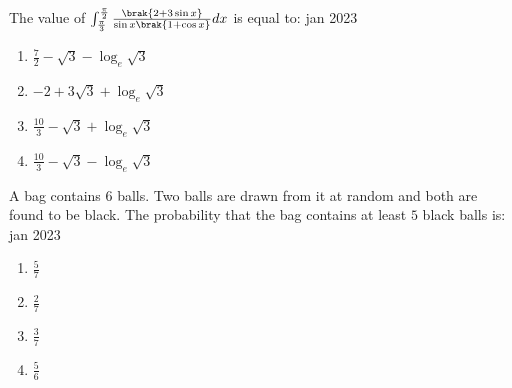     \item The value of $\int_{\frac{\pi}{3}}^{\frac{\pi}{2}}\frac{\brak{2+3\sin{x}}}{\sin{x}\brak{1+\cos{x}}}dx$ is equal to: \hfill{jan 2023}

        \begin{enumerate}
        \item $\frac{7}{2}-\sqrt{3}-\log_{e}\sqrt{3}$
        \item $-2+3\sqrt{3}+\log_{e}\sqrt{3}$
        \item $\frac{10}{3}-\sqrt{3}+\log_{e}\sqrt{3}$
        \item $\frac{10}{3}-\sqrt{3}-\log_{e}\sqrt{3}$
        \end{enumerate}

    \item A bag contains $6$ balls. Two balls are drawn from it at random and both are found to be black. The probability that the bag contains at least $5$ black balls is: \hfill{jan 2023}

        \begin{multicols}{4}
        \begin{enumerate}
        \item $\frac{5}{7}$
        \item $\frac{2}{7}$
        \item $\frac{3}{7}$
        \item $\frac{5}{6}$
        \end{enumerate}
        \end{multicols}
